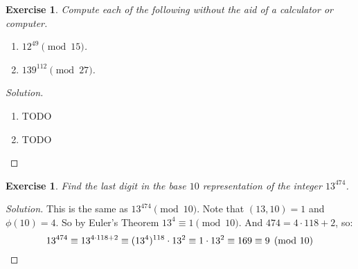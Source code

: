 \documentclass[12pt,leqno]{article}
\numberwithin{equation}{section}
\newtheorem{exer}[thm]{Exercise}
\theoremstyle{definition}
\begin{document}
\pagebreak
\begin{exer}
Compute each of the following without the aid of a calculator or
computer.
\begin{enumerate}
\item $12^{49} \pmod{15}$.
\item $139^{112} \pmod{27}$.
\end{enumerate}
\end{exer}
\begin{proof}[Solution]$ $\\
\begin{enumerate}
\item
TODO

\item
TODO
\end{enumerate}
\end{proof}

\begin{exer}
Find the last digit in the base $10$ representation of the integer
$13^{474}$.
\end{exer}
\begin{proof}[Solution]
This is the same as $13^{474} \pmod{10}$.  Note that $(13, 10) = 1$ and $\phi(10) = 4$.  So by Euler's Theorem $13^4 \equiv 1 \pmod{10}$.  And $474 = 4 \cdot 118 + 2$, so:
\[13^{474} \equiv 13^{4\cdot 118 + 2} \equiv (13^4)^{118}\cdot 13^2 \equiv 1\cdot 13^2\\ \equiv 169 \equiv 9 \pmod{10}\]
\end{proof}
\end{document}
